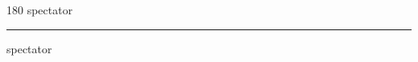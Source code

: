 
\begin{frame}
\begin{center}
\begin{turn}{180}
{\fontsize{2.5cm}{1em}\selectfont spectator}
\end{turn}
\vspace{1em}\par  
\hrule
\vspace{1em}\par  
{\fontsize{2.5cm}{1em}\selectfont spectator}
\end{center}
\end{frame}
